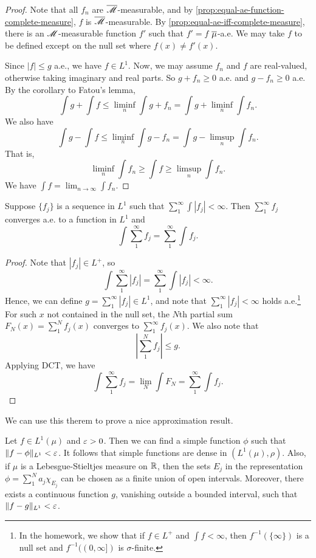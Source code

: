 \documentclass[12pt]{article} %
\begin{document}
\begin{proof}
    Note that all $f_n$ are $\overline{\mathscr{M}}$-measurable, and by
    \cref{prop:equal-ae-function-complete-measure}, $f$ is $\overline{\mathscr{M}}$-measurable. By \cref{prop:equal-ae-iff-complete-measure}, there is an $\mathscr{M}$-measurable function $f'$ such that $f' = f$ $\overline{\mu}$-a.e. We may take $f$ to be defined except on the null set where $f(x) \neq f'(x)$.

    Since $|f| \leq g$ a.e., we have $f \in L^1$. Now, we may assume $f_n$ and $f$ are real-valued, otherwise taking imaginary and real parts. So $g + f_n \geq 0$ a.e. and $g - f_n \geq 0$ a.e. By the corollary to Fatou's lemma, \[\int g + \int f \leq \liminf_n \int g + f_n = \int g + \liminf_n \int f_n.\] We also have \[\int g - \int f \leq \liminf_n \int g - f_n = \int g - \limsup_n \int f_n.\] That is, \[\liminf_n \int f_n \geq \int f \geq \limsup_n \int f_n.\] We have $\int f = \lim_{n \to \infty} \int f_n$.
\end{proof}

\begin{theorem}
    Suppose $\{f_j\}$ is a sequence in $L^1$ such that $\sum_1^\infty \int |f_j| < \infty$. Then $\sum_1^\infty f_j$ converges a.e. to a function in $L^1$ and \[\int \sum_1^\infty f_j = \sum_1^\infty \int f_j.\]
\end{theorem}

\begin{proof}
    Note that $|f_j| \in L^+$, so \[\int \sum_1^\infty |f_j| = \sum_1^\infty \int |f_j| < \infty.\] Hence, we can define $g = \sum_1^\infty |f_j| \in L^1$, and note that $\sum_1^\infty |f_j| < \infty$ holds a.e.\footnote{In the homework, we show that if $f \in L^+$ and $\int f < \infty$, then $f^{-1}(\{\infty\})$ is a null set and $f^{-1}((0, \infty])$ is $\sigma$-finite.} For such $x$ not contained in the null set, the $N$th partial sum $F_N(x) = \sum_1^N f_j(x)$ converges to $\sum_1^\infty f_j(x)$. We also note that \[\left|\sum_1^N f_j \right| \leq g.\] Applying DCT, we have \[\int \sum_1^\infty f_j = \lim_N \int F_N = \sum_1^\infty \int f_j.\]
\end{proof}

We can use this therem to prove a nice approximation result.

\begin{theorem}\label{thm:2.26}
    Let $f \in L^1(\mu)$ and $\varepsilon > 0$. Then we can find a simple function $\phi$ such that $\|f - \phi\|_{L^1} < \varepsilon$. It follows that simple functions are dense in $(L^1(\mu), \rho)$. Also, if $\mu$ is a Lebesgue-Stieltjes measure on $\mathbb{R}$, then the sets $E_j$ in the representation $\phi = \sum_1^N a_j \chi_{E_j}$ can be chosen as a finite union of open intervals. Moreover, there exists a continuous function $g$, vanishing outside a bounded interval, such that $\|f - g\|_{L^1} < \varepsilon$.
\end{theorem}
\end{document}
